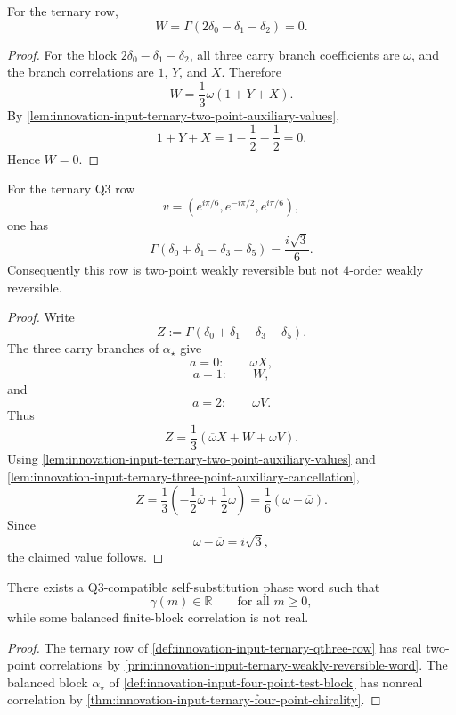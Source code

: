 \begin{lemma}
\label{lem:innovation-input-ternary-three-point-auxiliary-cancellation}
For the ternary row,
$$
W=\Gamma(2\delta_0-\delta_1-\delta_2)=0.
$$
\end{lemma}

\begin{proof}
For the block $2\delta_0-\delta_1-\delta_2$, all three carry branch
coefficients are $\omega$, and the branch correlations are $1$, $Y$, and
$X$. Therefore
$$
W=\frac13\omega(1+Y+X).
$$
By \autoref{lem:innovation-input-ternary-two-point-auxiliary-values},
$$
1+Y+X=1-\frac12-\frac12=0.
$$
Hence $W=0$.
\end{proof}

\begin{theorem}
\label{thm:innovation-input-ternary-four-point-chirality}
For the ternary Q3 row
$$
v=(e^{i\pi/6},e^{-i\pi/2},e^{i\pi/6}),
$$
one has
$$
\Gamma(\delta_0+\delta_1-\delta_3-\delta_5)
=
\frac{i\sqrt3}{6}.
$$
Consequently this row is two-point weakly reversible but not
$4$-order weakly reversible.
\end{theorem}

\begin{proof}
Write
$$
Z:=\Gamma(\delta_0+\delta_1-\delta_3-\delta_5).
$$
The three carry branches of $\alpha_\star$ give
$$
a=0:
\qquad
\overline\omega X,
$$
$$
a=1:
\qquad
W,
$$
and
$$
a=2:
\qquad
\omega V.
$$
Thus
$$
Z=
\frac13
\left(
\overline\omega X+W+\omega V
\right).
$$
Using
\autoref{lem:innovation-input-ternary-two-point-auxiliary-values} and
\autoref{lem:innovation-input-ternary-three-point-auxiliary-cancellation},
$$
Z=
\frac13
\left(
-\frac12\overline\omega+\frac12\omega
\right)
=
\frac16(\omega-\overline\omega).
$$
Since
$$
\omega-\overline\omega=i\sqrt3,
$$
the claimed value follows.
\end{proof}

\begin{corollary}
\label{cor:innovation-input-two-point-not-finite-block-reversible}
There exists a Q3-compatible self-substitution phase word such that
$$
\gamma(m)\in\mathbb R
\qquad
\text{for all }m\ge0,
$$
while some balanced finite-block correlation is not real.
\end{corollary}

\begin{proof}
The ternary row of
\autoref{def:innovation-input-ternary-qthree-row} has real two-point
correlations by
\autoref{prin:innovation-input-ternary-weakly-reversible-word}. The
balanced block $\alpha_\star$ of
\autoref{def:innovation-input-four-point-test-block} has nonreal
correlation by \autoref{thm:innovation-input-ternary-four-point-chirality}.
\end{proof}


